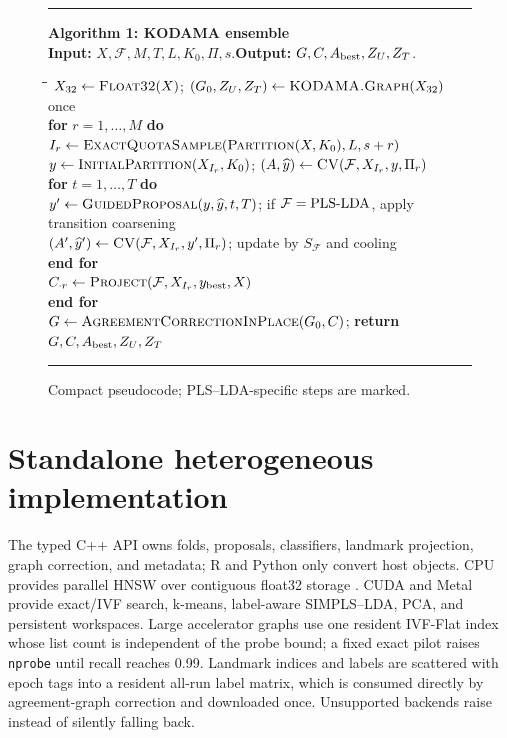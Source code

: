 \documentclass[twoside,11pt]{article}
\begin{document}
\begin{figure}[h!]
\hrule\vspace{2pt}
\begin{minipage}{0.98\linewidth}
\scriptsize
\textbf{Algorithm 1: KODAMA ensemble}\\
\textbf{Input:} $X,\mathcal F,M,T,L,K_0,\Pi,s$.\quad \textbf{Output:} $G,C,A_{\rm best},Z_U,Z_T$.
\begin{tabbing}
\quad\=\quad\=\quad\=\kill
$X_{32}\leftarrow\textsc{Float32}(X)$; $(G_0,Z_U,Z_T)\leftarrow\textsc{KODAMA.Graph}(X_{32})$ once\\
\textbf{for} $r=1,\ldots,M$ \textbf{do}\\
\> $I_r\leftarrow\textsc{ExactQuotaSample}(\textsc{Partition}(X,K_0),L,s+r)$\\
\> $y\leftarrow\textsc{InitialPartition}(X_{I_r},K_0)$; $(A,\widehat y)\leftarrow\textsc{CV}(\mathcal F,X_{I_r},y,\Pi_r)$\\
\> \textbf{for} $t=1,\ldots,T$ \textbf{do}\\
\>\> $y'\leftarrow\textsc{GuidedProposal}(y,\widehat y,t,T)$; if $\mathcal F={\rm PLS\mbox{-}LDA}$, apply transition coarsening\\
\>\> $(A',\widehat y')\leftarrow\textsc{CV}(\mathcal F,X_{I_r},y',\Pi_r)$; update by $S_{\mathcal F}$ and cooling\\
\> \textbf{end for}\\
\> $C_{\cdot r}\leftarrow\textsc{Project}(\mathcal F,X_{I_r},y_{\rm best},X)$\\
\textbf{end for}\\
$G\leftarrow\textsc{AgreementCorrectionInPlace}(G_0,C)$; \textbf{return} $G,C,A_{\rm best},Z_U,Z_T$
\end{tabbing}
\end{minipage}
\vspace{2pt}\hrule
\caption{Compact pseudocode; PLS--LDA-specific steps are marked.}
\label{alg:kodama}
\end{figure}

\section{Standalone heterogeneous implementation}

The typed C++ API owns folds, proposals, classifiers, landmark projection, graph correction, and metadata; R and Python only convert host objects. CPU provides parallel HNSW over contiguous float32 storage \citep{malkov2020hnsw}. CUDA and Metal provide exact/IVF search, k-means, label-aware SIMPLS--LDA, PCA, and persistent workspaces. Large accelerator graphs use one resident IVF-Flat index whose list count is independent of the probe bound; a fixed exact pilot raises \texttt{nprobe} until recall reaches 0.99. Landmark indices and labels are scattered with epoch tags into a resident all-run label matrix, which is consumed directly by agreement-graph correction and downloaded once. Unsupported backends raise instead of silently falling back.
\end{document}
